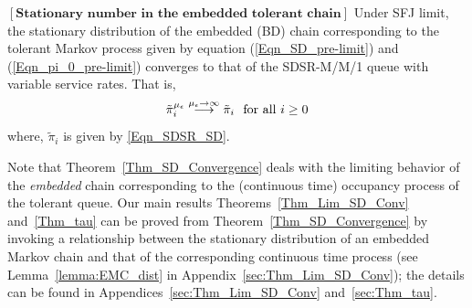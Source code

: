 \begin{thm}
  $\left[\textbf{Stationary number in the embedded tolerant
      chain}\right]$
  \label{Thm_SD_Convergence}
  Under SFJ limit,
  the stationary distribution of the embedded (BD) chain corresponding
  to the tolerant Markov process given by equation
  (\ref{Eqn_SD_pre-limit}) and (\ref{Eqn_pi_0_pre-limit}) converges to
  that of the SDSR-M/M/1 queue with variable service rates. That is,
  $$
  \tilde{\pi}_i^{\mu_\epsilon} \stackrel{{\mu_\epsilon} \to \infty}{\longrightarrow} \tilde{\pi}_i \ \ \mbox{for all} \  i \geq 0
  $$ where, $\tilde{\pi}_i$ is given by \eqref{Eqn_SDSR_SD}.  
\end{thm}

Note that Theorem~\ref{Thm_SD_Convergence} deals with the limiting
behavior of the \emph{embedded} chain corresponding to the (continuous
time) occupancy process of the tolerant queue. Our main results
Theorems~\ref{Thm_Lim_SD_Conv} and~\ref{Thm_tau} can be proved from
Theorem~\ref{Thm_SD_Convergence} by invoking a relationship between
the stationary distribution of an embedded Markov chain and that of
the corresponding continuous time process (see
Lemma~\ref{lemma:EMC_dist} in Appendix~\ref{sec:Thm_Lim_SD_Conv}); the
details can be found in Appendices~\ref{sec:Thm_Lim_SD_Conv}
and~\ref{sec:Thm_tau}.

